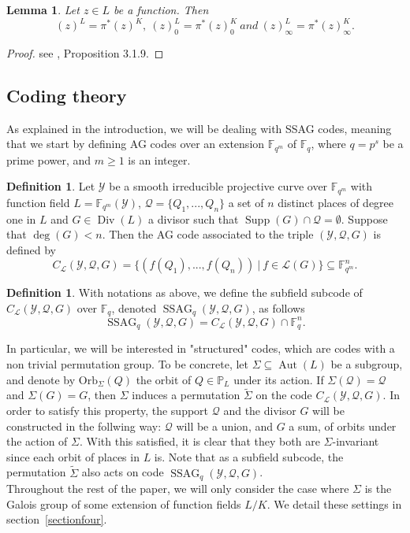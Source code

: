 \documentclass[10pt]{article}
\newtheorem{lem1}[thm]{Lemma}
\theoremstyle{definition}
\theoremstyle{definition}
\theoremstyle{definition}
\newtheorem{def1}[thm]{Definition}
\newcommand{\PP}{\mathbb{P}}
\newcommand{\fqm}{\mathbb{F}_{q^m}}
\newcommand{\fq}{\mathbb{F}_q}
\newcommand{\su}{\subseteq}
\newcommand{\Y}{\mathcal{Y}}
\newcommand{\QR}{\mathcal{Q}}
\newcommand{\Div}{\operatorname{Div}}
\newcommand{\Supp}{\operatorname{Supp}}
\newcommand{\Aut}{\operatorname{Aut}}
\newcommand{\ssag}{\operatorname{SSAG}}
\newcommand{\calL}{\mathcal{L}}
\begin{document}
\begin{lem1} \label{tirarr}
Let $z \in L$ be a function. Then 
\[(z)^L = \pi^*(z)^K, \ (z)^L_0 = \pi^*(z)_0^K \ and \ (z)^L_{\infty} = \pi^*(z)^K_{\infty}.\]
\end{lem1} 

\begin{proof}
see \cite{Sti}, Proposition 3.1.9.
\end{proof}


\subsection{Coding theory}


As explained in the introduction, we will be dealing with SSAG codes, meaning that we start by defining AG codes over an extension $\fqm$ of $\fq$, where $q=p^s$ be a prime power, and $m \geq 1$ is an integer.

\begin{def1} \label{defagcode}
Let $\Y$ be a smooth irreducible projective curve over $\fqm$ with function field $L = \fqm(\Y)$, $\QR = \{Q_1,...,Q_n\}$ a set of $n$ distinct places of degree one in $L$  and $G \in \Div(L)$ a divisor such that $\Supp(G) \cap \QR = \emptyset$. Suppose that $\deg(G)<n$. Then the AG code associated to the triple $(\Y,\QR,G)$ is defined by
\[C_{\calL}(\Y,\QR,G) = \{ (f(Q_1),...,f(Q_n)) \ | \ f \in \calL(G)\} \su \fqm^n.\]
\end{def1}

\begin{def1}
With notations as above, we define the subfield subcode of $C_{\calL}(\Y,\QR,G)$ over $\fq$, denoted $\ssag_q(\Y,\QR,G)$, as follows
\[ \ssag_q(\Y,\QR,G) = C_{\calL}(\Y,\QR,G) \cap \fq^n.\]
\end{def1}

In particular, we will be interested in "structured" codes, which are codes with a non trivial permutation group. To be concrete, let $\Sigma \su \Aut(L)$ be a subgroup, and denote by $\mathrm{Orb}_{\Sigma}(Q)$ the orbit of $Q \in \PP_L$ under its action. If $\Sigma(\QR) = \QR$ and $\Sigma(G)=G$, then $\Sigma$ induces a permutation $\tilde{\Sigma}$ on the code $C_{\calL}(\Y,\QR,G)$. In order to satisfy this property, the support $\QR$ and the divisor $G$ will be constructed in the follwing way: $\QR$ will be a union, and $G$ a sum, of orbits under the action of $\Sigma$. With this satisfied, it is clear that they both are $\Sigma$-invariant since each orbit of places in $L$ is. Note that as a subfield subcode, the permutation $\tilde{\Sigma}$ also acts on code $\ssag_q(\Y,\QR,G)$.\\
Throughout the rest of the paper, we will only consider the case where $\Sigma$ is the Galois group of some extension of function fields $L/K$. We detail these settings in section~\ref{sectionfour}.
\end{document}

